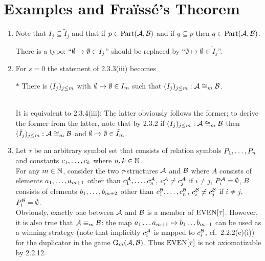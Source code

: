 \section{Examples and Fra\"{i}ss\'{e}'s Theorem}
\begin{enumerate}[1.]
%
\item {} Note that $I_j \subseteq \tilde{I}_j$ and that if $p \in {\mathrm{Part}(\mathcal{A}, \mathcal{B})}$ and if $q \subseteq p$ then $q \in {\mathrm{Part}(\mathcal{A}, \mathcal{B})}$.
\begin{remark}
There is a typo: ``$\emptyset \mapsto \emptyset \in I_j$'' should be replaced by ``$\emptyset \mapsto \emptyset \in \tilde{I}_j$''.
\end{remark}
%
\item {} For $s = 0$ the statement of 2.3.3(iii) becomes
\begin{quoteno}{$\ast$}
There is $(I_j)_{j \leq m}$ with $\emptyset \mapsto \emptyset \in I_m$ such that $\seqi{I_j}{j \leq m} : \strct{A} \isom[m] \strct{B}$.
\end{quoteno}
\medskip\\
It is equivalent to 2.3.4(iii): The latter obviously follows the former; to derive the former from the latter, note that by 2.3.2 if $\seqi{I_j}{j \leq m} : \strct{A} \isom[m] \strct{B}$ then $\seqi{\tilde{I}_j}{j \leq m} : \strct{A} \isom[m] \strct{B}$ and $\emptyset \mapsto \emptyset \in \tilde{I}_m$.
%
\item {} Let $\tau$ be an arbitrary symbol set that consists of relation symbols $P_{1}, \ldots, P_{n}$ and constants $c_{1}, \ldots, c_{k}$ where $n, k \in \mathbb{N}$.
\medskip\\
For any $m \in \mathbb{N}$, consider the two $\tau$-structures $\mathcal{A}$ and $\mathcal{B}$ where $A$ consists of elements $a_{1}, \ldots, a_{m + 1}$ other than $c^{\mathcal{A}}_{1}, \ldots, c^{\mathcal{A}}_{n}$, $c_i^{\mathcal{A}} \neq c_j^{\mathcal{A}}$ if $i \neq j$, $P_i^{\mathcal{A}} = \emptyset$, $B$ consists of elements $b_{1}, \ldots, b_{m + 2}$ other than $c^{\mathcal{B}}_{1}, \ldots, c^{\mathcal{B}}_{n}$, $c_i^{\mathcal{B}} \neq c_j^{\mathcal{B}}$ if $i \neq j$, $P_i^{\mathcal{B}} = \emptyset$.
\medskip\\
Obviously, exactly one between $\mathcal{A}$ and $\mathcal{B}$ is a member of ${\mathrm{EVEN}[\tau]}$. However, it is also true that $\strct{A} \equv[m] \strct{B}$: the map $a_{1} \ldots a_{m + 1} \mapsto b_{1} \ldots b_{m + 1}$ can be used as a winning strategy (note that implicitly $c_i^{\mathcal{A}}$ is mapped to $c_i^{\mathcal{B}}$, cf.\ 2.2.2(c)(i)) for the duplicator in the game $\game{m}{\strct{A}, \strct{B}}$. Thus ${\mathrm{EVEN}[\tau]}$ is not axiomatizable by 2.2.12.

\end{enumerate}
